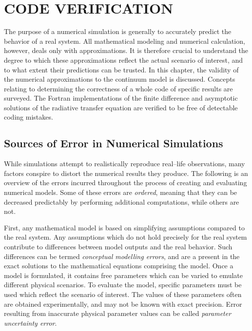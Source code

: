 \chapter{CODE VERIFICATION}
\label{chap:model_analysis}
The purpose of a numerical simulation is generally to accurately predict the behavior of a real system.
All mathematical modeling and numerical calculation, however, deals only with approximations.
It is therefore crucial to understand the degree to which these approximations reflect the actual scenario of interest, and to what extent their predictions can be trusted.
In this chapter, the validity of the numerical approximations to the continuum model is discussed.
Concepts relating to determining the correctness of a whole code of specific results are surveyed.
The Fortran implementations of the finite difference and asymptotic solutions of the radiative transfer equation are verified to be free of detectable coding mistakes.

\section{Sources of Error in Numerical Simulations}
While simulations attempt to realistically reproduce real--life observations, many factors conspire to distort the numerical results they produce.
The following is an overview of the errors incurred throughout the process of creating and evaluating numerical models.
Some of these errors are \textit{ordered}, meaning that they can be decreased predictably by performing additional computations, while others are not.

First, any mathematical model is based on simplifying assumptions compared to the real system.
Any assumptions which do not hold precisely for the real system contribute to differences between model outputs and the real behavior.
Such differences can be termed \textit{conceptual modelling errors}, and are a present in the exact solutions to the mathematical equations comprising the model.
Once a model is formulated, it contains free parameters which can be varied to emulate different physical scenarios.
To evaluate the model, specific parameters must be used which reflect the scenario of interest.
The values of these parameters often are obtained experimentally, and may not be known with exact precision.
Error resulting from inaccurate physical parameter values can be called \textit{parameter uncertainty error}.

